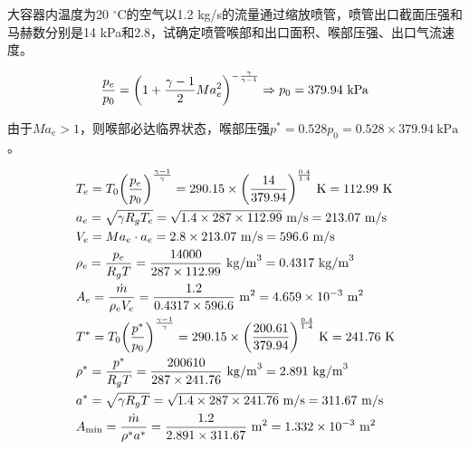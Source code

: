 \begin{example}
	大容器内温度为20 $^{\circ}$C的空气以1.2 kg/s的流量通过缩放喷管，喷管出口截面压强和马赫数分别是14 kPa和2.8，试确定喷管喉部和出口面积、喉部压强、出口气流速度。
	\vskip 0.3cm
	
	\begin{equation*}
		\dfrac{p_e}{p_0} = \qty(1 + \dfrac{\gamma - 1}{2} Ma_e^2)^{-\frac{\gamma}{\gamma - 1}} \Rightarrow p_0 = 379.94 \mathrm{~kPa}\\
	\end{equation*}
	
	由于$Ma_e > 1$，则喉部必达临界状态，喉部压强$p^{*} = 0.528 p_0 = 0.528 \times 379.94 \mathrm{~kPa}$。
	
	\begin{align*}
		&T_e = T_0\qty(\dfrac{p_e}{p_0})^{\frac{\gamma - 1}{\gamma}} = 290.15 \times \qty(\dfrac{14}{379.94})^{\frac{0.4}{1.4}} \mathrm{~K} = 112.99 \mathrm{~K}\\
		&a_e = \sqrt{\gamma R_g T_e} = \sqrt{1.4 \times 287 \times 112.99} \mathrm{~m/s} = 213.07 \mathrm{~m/s}\\
		&V_e = Ma_e \cdot a_e = 2.8 \times 213.07 \mathrm{~m/s} = 596.6 \mathrm{~m/s}\\
		&\rho_e = \dfrac{p_e}{R_g T} = \dfrac{14000}{287 \times 112.99} \mathrm{~kg/m}^3 = 0.4317 \mathrm{~kg/m}^3\\
		&A_e = \dfrac{\dot{m}}{\rho_e V_e} = \dfrac{1.2}{0.4317 \times 596.6} \mathrm{~m}^2 = 4.659 \times 10^{-3} \mathrm{~m}^2\\
		&T^{*} = T_0\qty(\dfrac{p^{*}}{p_0})^{\frac{\gamma - 1}{\gamma}} = 290.15 \times \qty(\dfrac{200.61}{379.94})^{\frac{0.4}{1.4}} \mathrm{~K} = 241.76 \mathrm{~K}\\
    	&\rho^{*} = \dfrac{p^{*}}{R_g T} = \dfrac{200610}{287 \times 241.76} \mathrm{~kg/m}^3 = 2.891 \mathrm{~kg/m}^3\\
    	&a^{*} = \sqrt{\gamma R_g T} = \sqrt{1.4 \times 287 \times 241.76} \mathrm{~m/s} = 311.67 \mathrm{~m/s}\\
    	&A_{\text{min}} = \dfrac{\dot{m}}{\rho^{*} a^{*}} = \dfrac{1.2}{2.891 \times 311.67} \mathrm{~m}^2 = 1.332 \times 10^{-3} \mathrm{~m}^2
    \end{align*}
\end{example}